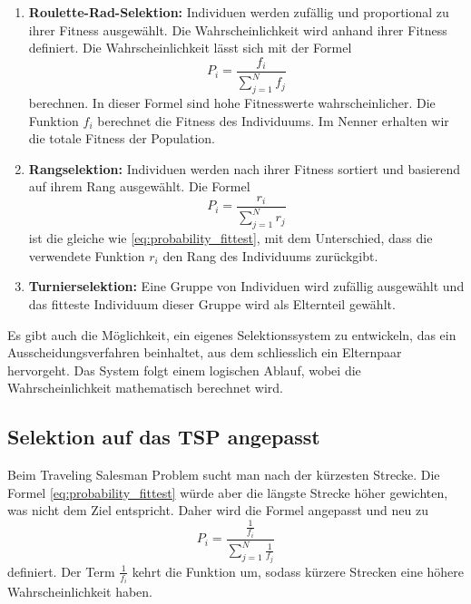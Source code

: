 \begin{enumerate}
    \item \textbf{Roulette-Rad-Selektion:} Individuen werden zufällig und
    proportional zu ihrer Fitness ausgewählt. Die Wahrscheinlichkeit wird 
    anhand ihrer Fitness definiert. Die Wahrscheinlichkeit lässt sich mit der Formel
    \begin{equation}
        P_i
        =
        \frac{f_i}{\sum_{j=1}^{N} f_j}
        \label{eq:probability_fittest}
    \end{equation}
    berechnen. In dieser Formel sind hohe Fitnesswerte wahrscheinlicher. Die Funktion \(f_i\) 
    berechnet die Fitness des Individuums. Im Nenner erhalten wir die totale Fitness der Population.
    \item \textbf{Rangselektion:} Individuen werden nach ihrer Fitness sortiert und basierend
    auf ihrem Rang ausgewählt. Die Formel 
    \begin{equation}
        P_i
        =
        \frac{r_i}{\sum_{j=1}^{N} r_j}
        \label{eq:probability_rating}
    \end{equation}
    ist die gleiche wie \eqref{eq:probability_fittest}, mit dem Unterschied, dass die verwendete Funktion 
    \(r_i\) den Rang des Individuums zurückgibt.
    \item \textbf{Turnierselektion:} Eine Gruppe von Individuen wird zufällig ausgewählt
    und das fitteste Individuum dieser Gruppe wird als Elternteil gewählt.
\end{enumerate}
Es gibt auch die Möglichkeit, ein eigenes Selektionssystem zu entwickeln, 
das ein Ausscheidungsverfahren beinhaltet, aus dem schliesslich ein 
Elternpaar hervorgeht. Das System folgt einem logischen Ablauf, wobei 
die Wahrscheinlichkeit mathematisch berechnet wird.

\subsection{Selektion auf das TSP angepasst
\label{buch:paper:varalg:subsection:selection_tsp}}
Beim Traveling Salesman Problem sucht man nach der kürzesten Strecke. Die Formel 
\eqref{eq:probability_fittest} würde aber die längste Strecke höher gewichten, was
nicht dem Ziel entspricht. Daher wird die Formel angepasst und neu zu 
\begin{equation}
    P_i
    =
    \frac{\frac{1}{f_i}}{\sum_{j=1}^{N} \frac{1}{f_j}}
    \label{eq:probability_fittest_tsp}
\end{equation}
definiert. Der Term \(\frac{1}{f_i}\) kehrt die Funktion um, sodass kürzere Strecken eine höhere
Wahrscheinlichkeit haben.
